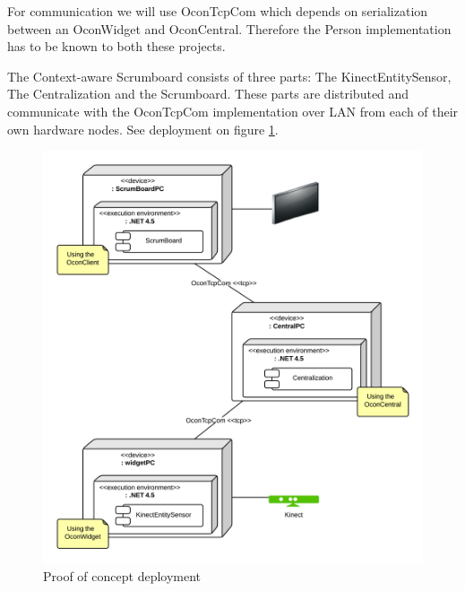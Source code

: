 \documentclass[../report.tex]{subfiles}
\begin{document}
For communication we will use OconTcpCom which depends on serialization between an OconWidget and OconCentral. Therefore the Person implementation has to be known to both these projects.



The Context-aware Scrumboard consists of three parts: The KinectEntitySensor, The Centralization and the Scrumboard. These parts are distributed and communicate with the OconTcpCom implementation over LAN from each of their own hardware nodes. See deployment on figure \ref{fig:ProofofConceptDeployment}.


\begin{figure}[H]
\begin{center}
\includegraphics[scale=0.155]{./ProofOfConceptDeployment.png}
\caption{Proof of concept deployment}
\end{center}
\label{fig:ProofofConceptDeployment}
\end{figure}

\end{document}
